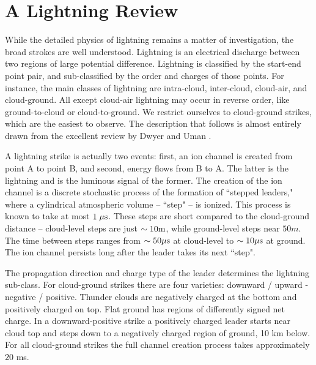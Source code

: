 \documentclass[%
 reprint,
 amsmath,amssymb,
 aps,
]{revtex4-2}
\begin{document}


\section{A Lightning Review} %
\label{sec:a_lightning_review}

    While the detailed physics of lightning remains a matter of investigation, the broad strokes are well understood. Lightning is an electrical discharge between two regions of large potential difference. Lightning is classified by the start-end point pair, and sub-classified by the order and charges of those points. For instance, the main classes of lightning are intra-cloud, inter-cloud, cloud-air, and cloud-ground. All except cloud-air lightning may occur in reverse order, like ground-to-cloud or cloud-to-ground. We restrict ourselves to cloud-ground strikes, which are the easiest to observe. The description that follows is almost entirely drawn from the excellent review by Dwyer and Uman \citep{DwyerUman2014}.

    A lightning strike is actually two events: first, an ion channel is created from point A to point B, and second, energy flows from B to A. The latter is the lightning and is the luminous signal of the former.  The creation of the ion channel is a discrete stochastic process of the formation of ``stepped leaders," where a cylindrical atmospheric volume -- ``step" -- is ionized. This process is known to take at most $1 \; \mu\rm{s}$. These steps are  short compared to the cloud-ground distance -- cloud-level steps  are just $\sim10 \rm{m}$, while ground-level steps near $50 m$. The time between steps ranges from  $\sim50 \mu\rm{s}$ at cloud-level to $\sim10 \mu\rm{s}$ at ground. The ion channel persists long after the leader takes its next ``step". 

    The propagation direction and charge type of the leader determines the lightning sub-class. For cloud-ground strikes there are four varieties: downward / upward - negative / positive. Thunder clouds are negatively charged at the bottom and positively charged on top. Flat ground has regions of differently signed net charge. In a downward-positive strike a positively charged leader starts near cloud top and steps down to a negatively charged region of ground, 10 km below. For all cloud-ground strikes the full channel creation process takes approximately $20$ ms.
\end{document}
